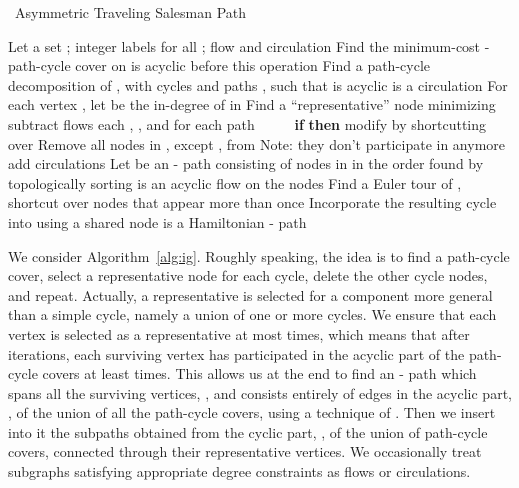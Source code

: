 \documentclass[11pt]{article}
\begin{document}
\begin{algorithm*}[ht]
  \caption{~Asymmetric Traveling Salesman Path} \label{alg:ig} 
\begin{algorithmic}[1] 
\State Let a set ; integer labels  for all ; flow  and circulation   \label{line:one}
 \label{line:iter}
\State Find the minimum-cost - path-cycle cover  on  
\label{line:findflow}
\State  \label{line:addf}
\Comment  is acyclic before this operation
\State Find a path-cycle decomposition of , with cycles  and paths , such that  is acyclic
 \label{line:finda}
\Comment  is a circulation
\State For each vertex , let  be the in-degree of  in 
\State Find a ``representative'' node  minimizing  \label{line:findv}
\State 
\Comment subtract flows
 each , , and for each path  
\State ~~~~~{\bf if}  {\bf then} modify  by shortcutting  over 
\State Remove all nodes in , except , from  \label{line:delw}
\Comment Note: they don't participate in  anymore
\State 
\Comment add circulations
\State 
\EndFor
\EndFor \label{line:endfor}
\State Let  be an - path consisting of nodes in  in the order found by  	topologically sorting  \label{line:findp} \newline \mbox{}
\Comment  is an acyclic flow on the nodes 
 \label{line:cyc}
\State Find a Euler tour of , shortcut over nodes that appear more than once \label{line:euler}
\State Incorporate the resulting cycle into  using a shared node \label{line:inc}
\EndFor \label{line:endcyc}
\Comment  is a Hamiltonian - path
\end{algorithmic}
\end{algorithm*}



We consider Algorithm~\ref{alg:ig}. Roughly speaking, the idea is to find a path-cycle cover, select a representative node for each cycle, delete the other cycle nodes, and repeat. Actually, a representative is selected for a component more general than a simple cycle, namely a union of one or more cycles. We ensure that each vertex is selected as a representative at most  times, which means that after  iterations, each surviving vertex has participated in the acyclic part of the path-cycle covers at least  times. This allows us at the end to find an - path which spans all the surviving vertices, , and consists entirely of edges in the acyclic part, , of the union of all the path-cycle covers, using a technique of \cite{nagarajan:ravi:latency}. Then we insert into it the subpaths obtained from the cyclic part, , of the union of path-cycle covers, connected through their representative vertices. 
We occasionally treat subgraphs satisfying appropriate degree constraints as flows or circulations.
\end{document}
